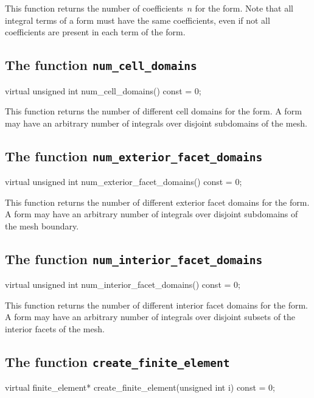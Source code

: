This function returns the number of coefficients~$n$ for the form.
Note that all integral terms of a form must have the same
coefficients, even if not all coefficients are present in each term of
the form.

\subsection{The function \texttt{num\_cell\_domains}}

\begin{code}
virtual unsigned int num_cell_domains() const = 0;
\end{code}

This function returns the number of different cell domains for the
form. A form may have an arbitrary number of integrals over disjoint
subdomains of the mesh.

\subsection{The function \texttt{num\_exterior\_facet\_domains}}

\begin{code}
virtual unsigned int num_exterior_facet_domains() const = 0;
\end{code}

This function returns the number of different exterior facet domains
for the form. A form may have an arbitrary number of integrals over
disjoint subdomains of the mesh boundary.

\subsection{The function \texttt{num\_interior\_facet\_domains}}

\begin{code}
virtual unsigned int num_interior_facet_domains() const = 0;
\end{code}

This function returns the number of different interior facet domains
for the form. A form may have an arbitrary number of integrals over
disjoint subsets of the interior facets of the mesh.

\subsection{The function \texttt{create\_finite\_element}}

\begin{code}
virtual finite_element*
create_finite_element(unsigned int i) const = 0;
\end{code}

